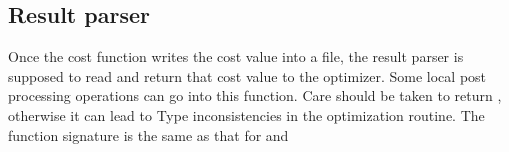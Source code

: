 \documentclass[letterpaper,12pt,english]{sphinxmanual}
\begin{document}
\begin{sphinxVerbatim}[commandchars=\\\{\}]
    \PYG{p}{[}\PYG{p}{]}
       
     \PYG{p}{[} \PYG{p}{]}  \PYG{p}{[}\PYG{p}{]}
\end{sphinxVerbatim}


\subsection{Result parser}
\label{\detokenize{examples/async_local_evaluator_example:result-parser}}
\sphinxAtStartPar
Once the cost function writes the cost value into a file, the result parser is supposed to read and return that cost
value to the optimizer. Some local post processing operations can go into this function. Care should be taken to return
, otherwise it can lead to Type inconsistencies in the optimization routine. The function signature
is the same as that for  and 
\end{document}
